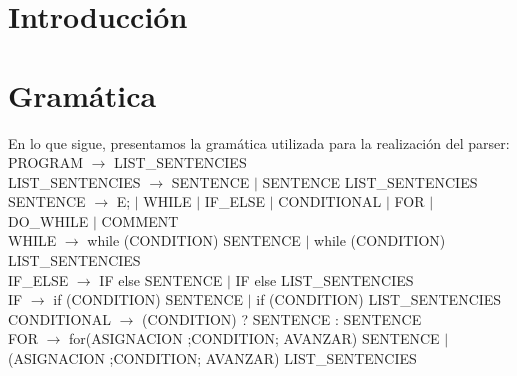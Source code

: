 \documentclass[10pt,a4paper]{article}
\begin{document}

\fecha{\today}



\maketitle

\tableofcontents

\newpage
\section{Introducción}

\section{Gramática}

En lo que sigue, presentamos la gramática utilizada para la realización del parser:\\

PROGRAM $\rightarrow$ LIST\_SENTENCIES \\

LIST\_SENTENCIES $\rightarrow$ SENTENCE $|$ SENTENCE LIST\_SENTENCIES\\

SENTENCE $\rightarrow$ E; $|$ WHILE $|$ IF\_ELSE $|$ CONDITIONAL $|$ FOR $|$ DO\_WHILE $|$ COMMENT \\

WHILE $\rightarrow$ while (CONDITION) SENTENCE $|$ while (CONDITION) {LIST\_SENTENCIES} \\

IF\_ELSE $\rightarrow$ IF else SENTENCE $|$ IF else {LIST\_SENTENCIES} \\

IF $\rightarrow$ if (CONDITION) SENTENCE $|$ if (CONDITION) {LIST\_SENTENCIES} \\

CONDITIONAL $\rightarrow$ (CONDITION) ? SENTENCE : SENTENCE \\

FOR $\rightarrow$ for(ASIGNACION ;CONDITION; AVANZAR) SENTENCE $|$ (ASIGNACION ;CONDITION; AVANZAR) {LIST\_SENTENCIES} \\
\end{document}
